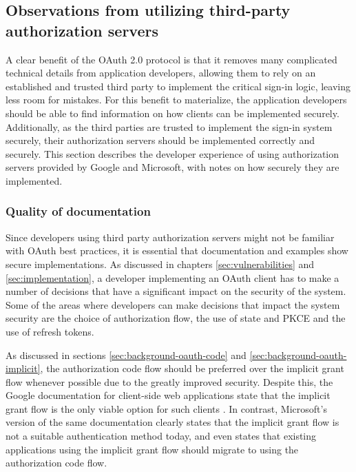 \subsection{Observations from utilizing third-party authorization servers}
\label{sec:observations}
A clear benefit of the OAuth 2.0 protocol is that it removes many complicated technical details from application developers, allowing them to rely on an established and trusted third party to implement the critical sign-in logic, leaving less room for mistakes.
For this benefit to materialize, the application developers should be able to find information on how clients can be implemented securely.
Additionally, as the third parties are trusted to implement the sign-in system securely, their authorization servers should be implemented correctly and securely.
This section describes the developer experience of using authorization servers provided by Google and Microsoft, with notes on how securely they are implemented.

\subsubsection{Quality of documentation}
\label{sec:observations-documentation}
Since developers using third party authorization servers might not be familiar with OAuth best practices, it is essential that documentation and examples show secure implementations.
As discussed in chapters \ref{sec:vulnerabilities} and \ref{sec:implementation}, a developer implementing an OAuth client has to make a number of decisions that have a significant impact on the security of the system.
Some of the areas where developers can make decisions that impact the system security are the choice of authorization flow, the use of state and PKCE and the use of refresh tokens.

As discussed in sections \ref{sec:background-oauth-code} and \ref{sec:background-oauth-implicit}, the authorization code flow should be preferred over the implicit grant flow whenever possible due to the greatly improved security.
Despite this, the Google documentation for client-side web applications state that the implicit grant flow is the only viable option for such clients \citep{noauthor_oauth_clientside}.
In contrast, Microsoft's version of the same documentation clearly states that the implicit grant flow is not a suitable authentication method today, and even states that existing applications using the implicit grant flow should migrate to using the authorization code flow\citep{owenrichards1_microsoft_2024}.


